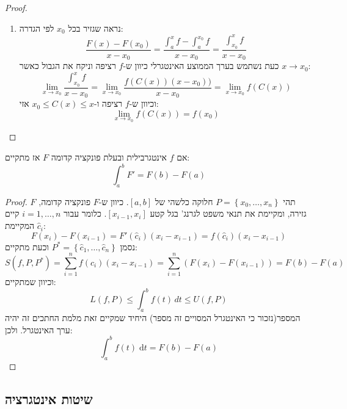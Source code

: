\documentclass{tstextbook}
\begin{document}
\begin{proof}
  \begin{enumerate}
    \item נראה שגזיר בכל \(x_0\) לפי הגדרה:\\
$$\frac{F(x)-F(x_0)}{x-x_0}=\frac{\int_a^x f -\int_a^{x_0} f}{x-x_0}=\frac{\int_{x_0}^x f}{x-x_0}$$
כעת נשתמש בערך הממוצע האינטגרלי כיוון ש-\(f\) רציפה וניקח את הגבול כאשר \(x\rightarrow x_0\):
$$\lim_{x\rightarrow x_0} \frac{\int_{x_0}^x f}{x-x_0} = \lim_{x\rightarrow x_0} \frac{f(C(x))(x-x_0))}{x-x_0}=\lim_{x\rightarrow x_0} f(C(x))$$
וכיוון ש-\(f\) רציפה ו-\(x_0 \leq C(x)\leq x\) אזי:
$$\underset{x\rightarrow x_0}{\lim} f(C(x))=f(x_0)$$
  \end{enumerate}
\end{proof}
\begin{proposition}
אם \(f\) אינטגרבילית ובעלת פונקציה קדומה \(F\) אז מתקיים: 
$$\int_a^b F' = F(b)-F(a)$$

\end{proposition}
\begin{proof}
תהי \(P=\left\{  x_{0},\dots,x_{n}  \right\}\) חלוקה כלשהי של \([a,b]\). כיוון ש-\(F\) פונקציה קדומה, \(F\) גזירה, ומקיימת את תנאי משפט לגרנג' בגל קטע \([x_{i-1},x_{i}]\). כלומר עבור \(i=1,\dots,n\) קיים \(\hat{c}_{i}\) המקיימת:
$$F(x_{i})-F(x_{i-1})=F'\left( \hat{c}_{i} \right)(x_{i}-x_{i-1})=f\left( \hat{c}_{i} \right)(x_{i}-x_{i-1})$$
נסמן \(P^{*}=\left\{  \hat{c}_{1},\dots,\hat{c}_{n}  \right\}\) וכעת מתקיים:
$$S(f,P,P^{*})=\sum_{i=1}^{n} f\left( \hat{c}_{i} \right)(x_{i}-x_{i-1})=\sum_{i=1}^{n} (F(x_{i})-F(x_{i-1}))=F(b)-F(a)$$
וכיוון שמתקיים:
$$L(f,P)\leq \int_{a}^{b} f(t) \, dt\leq U(f,P) $$
המספר(נזכור כי האינטגרל המסויים זה מספר) היחיד שמקיים זאת מלמת החתכים זה יהיה ערך האינטגרל. ולכן:
$$\int_{a}^{b}f(t)\;\mathrm{d}t=F(b)-F(a)$$

\end{proof}
\subsection{שיטות אינטגרציה}
\end{document}
